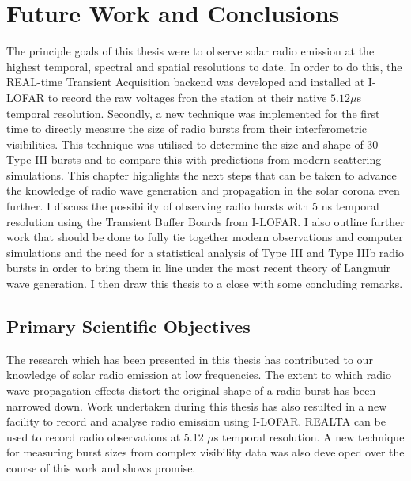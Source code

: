 \doublespacing
\chapter{Future Work and Conclusions}
\label{chap:future}
The principle goals of this thesis were to observe solar radio emission at the highest temporal, spectral and spatial resolutions to date. In order to do this, the REAL-time Transient Acquisition backend was developed and installed at I-LOFAR to record the raw voltages fron the station at their native $5.12 \mu$s temporal resolution.
Secondly, a new technique was implemented for the first time to directly measure the size of radio bursts from their interferometric visibilities. This technique was utilised to determine the size and shape of 30 Type III bursts and to compare this with predictions from modern scattering simulations.
This chapter highlights the next steps that can be taken to advance the knowledge of radio wave generation and propagation in the solar corona even further. I discuss the possibility of observing radio bursts with 5 ns temporal resolution using the Transient Buffer Boards from I-LOFAR. I also outline further work that should be done to fully tie together modern observations and computer simulations and the need for a statistical analysis of Type III and Type IIIb radio bursts in order to bring them in line under the most recent theory of Langmuir wave generation. I then draw this thesis to a close with some concluding remarks.

\section{Primary Scientific Objectives}
The research which has been presented in this thesis has contributed to our knowledge of solar radio emission at low frequencies. The extent to which radio wave propagation effects distort the original shape of a radio burst has been narrowed down. Work undertaken during this thesis has also resulted in a new facility to record and analyse radio emission using I-LOFAR. REALTA can be used to record radio observations at 5.12 $\mu$s temporal resolution. A new technique for measuring burst sizes from complex visibility data was also developed over the course of this work and shows promise.

